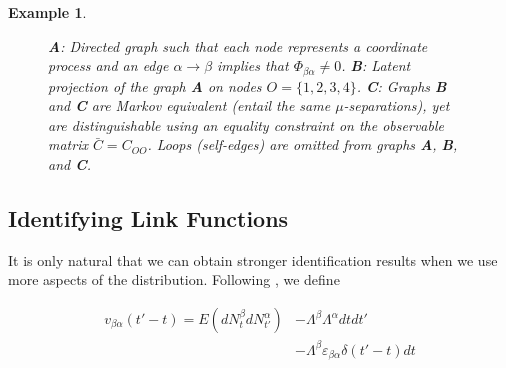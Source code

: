 \documentclass[accepted]{uai2021} %
\newtheorem{exmp}[thm]{Example}
\begin{document}
\begin{exmp}
\begin{figure*}
\begin{subfigure}{0.3\linewidth}
			\end{subfigure}
			\caption{\label{fig:smallCycle} \textbf{A}: Directed graph such 
			that 
			each node represents a coordinate process and an edge $\alpha 
			\rightarrow \beta$ implies that $\Phi_{\beta\alpha}\neq 0$. 
			\textbf{B}: Latent projection of the graph \textbf{A} on nodes $O = 
			\{1,2,3,4\}$. \textbf{C}: Graphs \textbf{B} and \textbf{C} are 
			Markov 
			equivalent (entail the same $\mu$-separations), yet are 
			distinguishable using an equality constraint on the observable 
			matrix $\bar{C} = C_{OO}$. Loops 
			(self-edges) are omitted from 
			graphs \textbf{A}, \textbf{B}, and \textbf{C}.}
		\end{figure*}
\end{exmp}



\subsection{Identifying Link Functions}
\label{ssec:idCauFunc}

It is only natural that we can obtain stronger identification results when we 
use more aspects of the distribution. Following 
\cite{bacry2016}, we define

\begin{align}
	v_{\beta\alpha}(t' - t) = E(dN_t^\beta dN_{t'}^\alpha) & - 
	\Lambda^\beta\Lambda^\alpha dt dt' \nonumber \\ & - \Lambda^\beta 
	\varepsilon_{\beta\alpha} 
	\delta(t'-t) dt
	\label{eq:infv}
\end{align}
\end{document}
